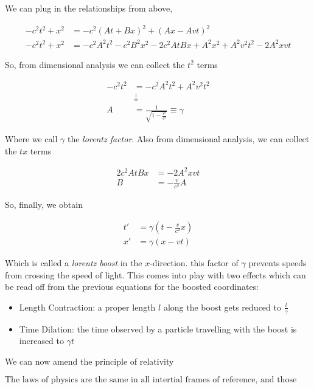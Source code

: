 \documentclass{article}
\begin{document}
We can plug in the relationships from above,

\begin{align}
    -c^2t^2 + x^2 &= -c^2(At + Bx)^2 + (Ax - Avt)^2 \\
    -c^2t^2 + x^2 &= -c^2A^2t^2 - c^2B^2x^2 -2c^2AtBx + A^2x^2 + A^2v^2t^2 - 2A^2xvt
\end{align}

So, from dimensional analysis we can collect the $t^2$ terms

\begin{align}
    -c^2t^2 &= -c^2A^2t^2 + A^2v^2t^2 \\
    &\downarrow \\
    A &= \frac{1}{\sqrt{1 - \frac{v^c}{c^2}}} \equiv \gamma
\end{align}

Where we call $\gamma$ the \textit{lorentz factor}. Also from dimensional analysis, we can collect the $tx$ terms

\begin{align}
    2c^2AtBx &= -2A^2xvt \\
    B &= -\frac{v}{c^2}A
\end{align}

So, finally, we obtain

\begin{align}
    t' &= \gamma(t - \frac{v}{c^2}x) \\
    x' &= \gamma(x-vt)
\end{align}

Which is called a \textit{lorentz boost} in the $x$-direction. this factor of $\gamma$ prevents speeds from crossing the speed of light. This comes into play with two effects which can be read off from the previous equations for the boosted coordinates:

\begin{itemize}
    \item Length Contraction: a proper length $l$ along the boost gets reduced to $\frac{l}{\gamma}$
    \item Time Dilation: the time observed by a particle travelling with the boost is increased to $\gamma t$
\end{itemize}

We can now amend the principle of relativity

\begin{equation}
    \boxed{\text{The laws of physics are the same in all intertial frames of reference, and those laws are that of special relativity}}
\end{equation}
\end{document}
